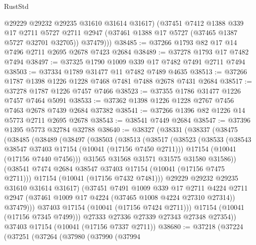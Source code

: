 \begin{lexlean}{RustStd}
\begin{coremodule}
          @29229
          @29232
          @29235
          @31610
          @31614
          @31617)
        (@37451
          @7412
          @1388
          @339
          @17
          @2711
          @5727
          @2711
          @2947
          (@37461 @1388 @17 @5727 (@37465 @1387 @5727 @32701 @32705))
          @37479)))
@38485 := @37266 @1793 @82 @17 @14 @7496 @2711 @2695 @2678 @7423 @2684
@38489 := @37278 @1793 @17 @7482 @7494
@38497 := @37325 @1790 @1009 @339 @17 @7482 @7491 @2711 @7494
@38503 := @37334 @1789 @31477 @11 @7482 @7489 @4635
@38513 := @37266 @1787 @1398 @1226 @1228 @7468 @7481 @7488 @2678 @7431 @2684
@38517 := @37278 @1787 @1226 @7457 @7466
@38523 := @37355 @1786 @31477 @1226 @7457 @7464 @5091
@38533 := @37362 @1398 @1226 @1228 @2767 @7456 @7463 @2678 @7439 @2684 @37382
@38541 := @37266 @1396 @82 @1226 @14 @5773 @2711 @2695 @2678
@38543 := @38541 @7449 @2684
@38547 := @37396 @1395 @5773 @32784 @32788
@38640 := @38327
    (@38331
      (@38337
        (@38475
          (@38485
            (@38489
              (@38497
                (@38503
                  (@38513
                    (@38517
                      (@38523
                        (@38533
                          (@38543 @38547 @37403 @17154 (@10041 (@17156 @7450 @2711)))
                          @17154
                          (@10041 (@17156 @7440 @7456)))
                        @31565
                        @31568
                        @31571
                        @31575
                        @31580
                        @31586))
                    (@38541 @7474 @2684 @38547 @37403 @17154 (@10041 (@17156 @7475 @2711)))
                    @17154
                    (@10041 (@17156 @7432 @7481)))
                  @29229
                  @29232
                  @29235
                  @31610
                  @31614
                  @31617)
                (@37451
                  @7491
                  @1009
                  @339
                  @17
                  @2711
                  @4224
                  @2711
                  @2947
                  (@37461 @1009 @17 @4224 (@37465 @1008 @4224 @27310 @27314))
                  @37479)))
            @37403
            @17154
            (@10041 (@17156 @7424 @2711)))
          @17154
          (@10041 (@17156 @7345 @7499)))
        @27333
        @27336
        @27339
        @27343
        @27348
        @27354))
    @37403
    @17154
    (@10041 (@17156 @7337 @2711))
@38680 := @37218
    (@37224
      (@37251
        (@37264
          (@37980
            (@37990
              (@37994

\end{coremodule}
\end{lexlean}
